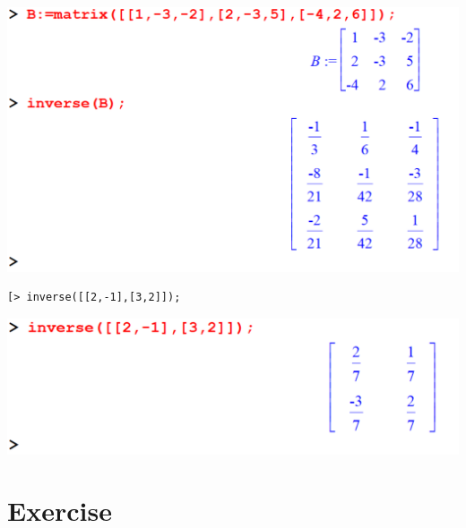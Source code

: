 \documentclass[
]{book}
\theoremstyle{definition}
\theoremstyle{definition}
\theoremstyle{definition}
\theoremstyle{definition}
\theoremstyle{remark}
\begin{document}
\includegraphics{figures/Lesson 4/fig14.png}

\begin{verbatim}
[> inverse([[2,-1],[3,2]]);
\end{verbatim}

\includegraphics{figures/Lesson 4/fig15.png}

\section{Exercise}\label{exercise}
\end{document}
